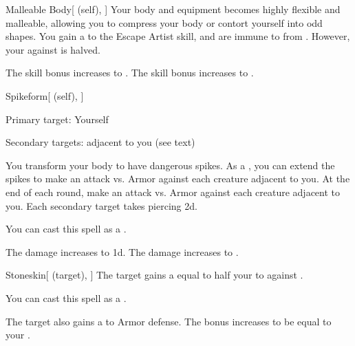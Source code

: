 \lowercase{\hypertarget{spell:Malleable Body}{}}\label{spell:Malleable Body}
\begin{attuneability}[Rank 4]{\hypertarget{spell:Malleable Body}{Malleable Body}}[ (self), ]
Your body and equipment becomes highly flexible and malleable, allowing you to compress your body or contort yourself into odd shapes.
You gain a   to the Escape Artist skill, and are immune to  from .
However, your  against  is halved.

\rankline
{} The skill bonus increases to .
 The skill bonus increases to .
\end{attuneability}
\vspace{0.25em}



\lowercase{\hypertarget{spell:Spikeform}{}}\label{spell:Spikeform}
\begin{attuneability}[Rank 4]{\hypertarget{spell:Spikeform}{Spikeform}}[ (self), ]

Primary target: Yourself
\par\noindent
Secondary targets:  adjacent to you (see text)

You transform your body to have dangerous spikes.
As a , you can extend the spikes to make an attack vs. Armor against each creature adjacent to you.
At the end of each round, make an attack vs. Armor against each creature adjacent to you.
\hit Each secondary target takes piercing  \minus2d.

You can cast this spell as a .

\rankline
{} The damage increases to  \minus1d.
 The damage increases to .
\end{attuneability}
\vspace{0.25em}



\lowercase{\hypertarget{spell:Stoneskin}{}}\label{spell:Stoneskin}
\begin{attuneability}[Rank 4]{\hypertarget{spell:Stoneskin}{Stoneskin}}[ (target), ]
The target gains a  equal to half your  to  against .

You can cast this spell as a .

\rankline
{} The target also gains a   to Armor defense.
 The bonus increases to be equal to your .
\end{attuneability}
\vspace{0.25em}



